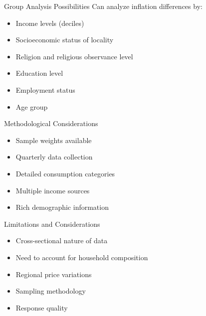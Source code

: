 \documentclass{beamer}
\begin{document}
\begin{frame}{Group Analysis Possibilities}
    Can analyze inflation differences by:
    \begin{itemize}
        \item Income levels (deciles)
        \item Socioeconomic status of locality
        \item Religion and religious observance level
        \item Education level
        \item Employment status
        \item Age group
    \end{itemize}
\end{frame}

\begin{frame}{Methodological Considerations}
    \begin{itemize}
        \item Sample weights available 
        \item Quarterly data collection
        \item Detailed consumption categories
        \item Multiple income sources
        \item Rich demographic information
    \end{itemize}
\end{frame}

\begin{frame}{Limitations and Considerations}
    \begin{itemize}
        \item Cross-sectional nature of data
        \item Need to account for household composition
        \item Regional price variations
        \item Sampling methodology
        \item Response quality
    \end{itemize}
\end{frame}
\end{document}
